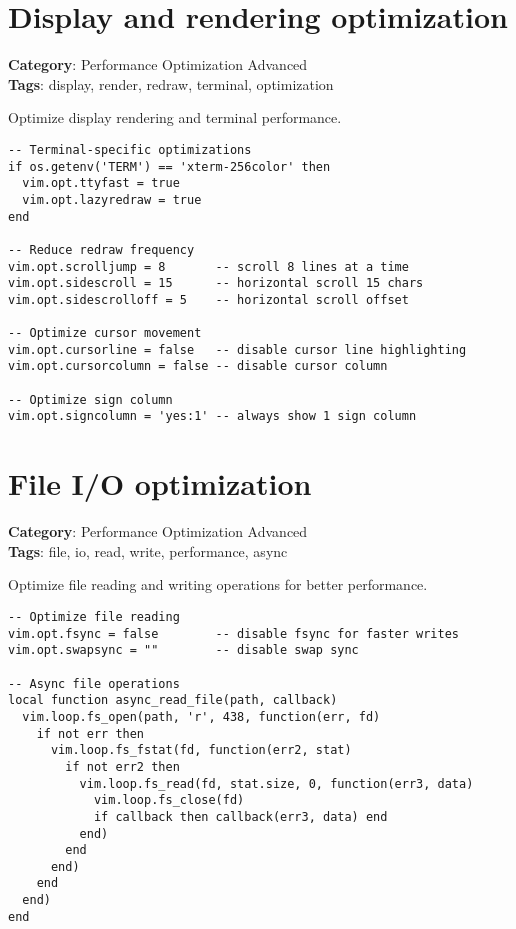 {{{{{{{{{{\section{Display and rendering optimization}

\textbf{Category}: Performance Optimization Advanced\\ \textbf{Tags}: display, render, redraw, terminal, optimization
\vspace{0.5cm}

Optimize display rendering and terminal performance.

\begin{Exa*}{}
\begin{Verbatim}[fontsize=\footnotesize, breaklines, breakanywhere]
-- Terminal-specific optimizations
if os.getenv('TERM') == 'xterm-256color' then
  vim.opt.ttyfast = true
  vim.opt.lazyredraw = true
end

-- Reduce redraw frequency
vim.opt.scrolljump = 8       -- scroll 8 lines at a time
vim.opt.sidescroll = 15      -- horizontal scroll 15 chars
vim.opt.sidescrolloff = 5    -- horizontal scroll offset

-- Optimize cursor movement
vim.opt.cursorline = false   -- disable cursor line highlighting
vim.opt.cursorcolumn = false -- disable cursor column

-- Optimize sign column
vim.opt.signcolumn = 'yes:1' -- always show 1 sign column
\end{Verbatim}
\end{Exa*}

\section{File I/O optimization}

\textbf{Category}: Performance Optimization Advanced\\ \textbf{Tags}: file, io, read, write, performance, async
\vspace{0.5cm}

Optimize file reading and writing operations for better performance.

\begin{Exa*}{}
\begin{Verbatim}[fontsize=\footnotesize, breaklines, breakanywhere]
-- Optimize file reading
vim.opt.fsync = false        -- disable fsync for faster writes
vim.opt.swapsync = ""        -- disable swap sync

-- Async file operations
local function async_read_file(path, callback)
  vim.loop.fs_open(path, 'r', 438, function(err, fd)
    if not err then
      vim.loop.fs_fstat(fd, function(err2, stat)
        if not err2 then
          vim.loop.fs_read(fd, stat.size, 0, function(err3, data)
            vim.loop.fs_close(fd)
            if callback then callback(err3, data) end
          end)
        end
      end)
    end
  end)
end
\end{Verbatim}
\end{Exa*}

}}}}}}}}}}
